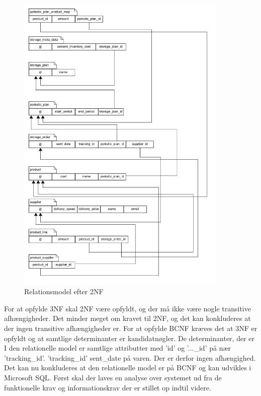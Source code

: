 \begin{figure}[H]
    \centering
    \includegraphics[width=0.9\textwidth]{figures/krav/relation_model_1th_normalization.png}
    \caption{Relationsmodel efter 2NF}
    \label{fig:relational_model_0}
\end{figure}

For at opfylde 3NF skal 2NF være opfyldt, og der må ikke være nogle transitive afhængigheder. Det minder meget om kravet til 2NF, og det kan konkluderes at der ingen transitive afhængigheder er.
For at opfylde BCNF kræves det at 3NF er opfyldt og at samtlige determinanter er kandidatnøgler. De determinanter, der er I den relationelle model er samtlige attributter med 'id' og '...\_id' på nær 'tracking\_id'. 'tracking\_id' sent\_date på varen. Der er derfor ingen afhængighed. 
Det kan nu konkluderes at den relationelle model er på BCNF og kan udvikles i Microsoft SQL. Først skal der laves en analyse over systemet ud fra de funktionelle krav og informationskrav der er stillet op indtil videre. 

